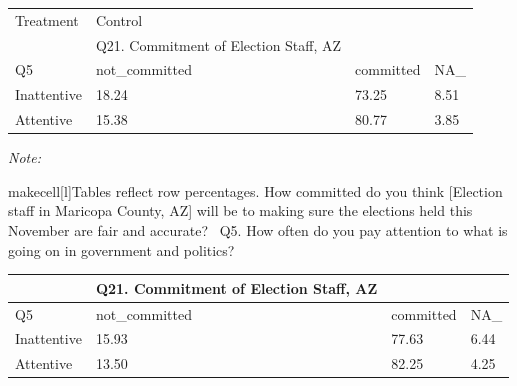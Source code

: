 \documentclass[
  11pt,
  a4paper,
]{article}
\begin{document}
\begin{table}
\centering
\centering
\fontsize{12}{14}\selectfont
\begin{threeparttable}
\begin{tabular}[t]{l|l|l|l}
\hline
\multicolumn{1}{l|}{Treatment} & \multicolumn{1}{l}{Control} \\
\cline{1-1} \cline{2-2}
 & Q21. Commitment of Election Staff, AZ &  & \\
\hline
Q5 & not\_committed & committed & NA\_\\
\hline
Inattentive & 18.24 & 73.25 & 8.51\\
\hline
Attentive & 15.38 & 80.77 & 3.85\\
\hline
\end{tabular}
\begin{tablenotes}
\small
\item \textit{Note: } 
\item makecell[l]{Tables reflect row percentages. How committed do you think [Election staff in Maricopa County, AZ] will be to making sure the elections held this November are fair and accurate? \ Q5. How often do you pay attention to what is going on in government and politics?}
\end{tablenotes}
\end{threeparttable}
\centering
\begin{tabular}[t]{l|l|l|l}
\hline
 & Q21. Commitment of Election Staff, AZ &  & \\
\hline
Q5 & not\_committed & committed & NA\_\\
\hline
Inattentive & 15.93 & 77.63 & 6.44\\
\hline
Attentive & 13.50 & 82.25 & 4.25\\
\hline
\end{tabular}
\end{table}
\end{document}
